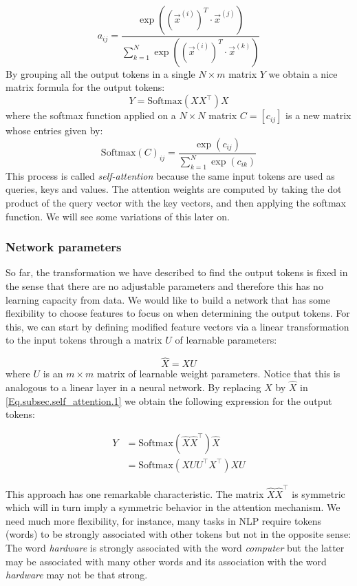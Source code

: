     \[
    a_{ij} = \frac{\exp((\vec{x}^{(i)})^{ T} \cdot \vec{x}^{(j)})}{\sum_{k=1}^N \exp((\vec{x}^{(i)})^{T} \cdot \vec{x}^{(k)})}
    \]
    By grouping all the output tokens in a single $N \times m$ matrix $Y$ we obtain a nice matrix formula for the output tokens: 
    \begin{equation}\label{Eq.subsec.self_attention.1}
        Y = \textrm{Softmax}(X X^\top) X 
    \end{equation}
    where the softmax function applied on a $N\times N$ matrix $C = [c_{ij}]$ is a new matrix whose entries given by:
    \[ \textrm{Softmax}(C)_{ij} = \frac{\exp(c_{ij})}{\sum_{k=1}^N \exp(c_{ik})} \] 
    This process is called \emph{self-attention} because the same input tokens are used as queries, keys and values. The attention weights are computed by taking the dot product of the query vector with the key vectors, and then applying the softmax function. We will see some variations of this later on.
    
    \subsubsection*{Network parameters}
    So far, the transformation we have described to find the output tokens is fixed in the sense that there are no adjustable parameters and therefore this has no learning capacity from data. We would like to build a network that has some flexibility to choose features to focus on when determining the output tokens. For this, we can start by defining modified feature vectors via a linear transformation to the input tokens through a matrix $U$ of learnable parameters:

    \[ \widehat{X} = X U \]
    where $U$ is an $m \times m$ matrix of learnable weight parameters. Notice that this is analogous to a linear layer in a neural network. By replacing $X$ by $\widehat{X}$ in \eqref{Eq.subsec.self_attention.1} we obtain the following expression for the output tokens:

    \begin{align}\label{Eq.subsec.self_attention.2}
        Y &= \textrm{Softmax}(\widehat{X} \widehat{X}^\top) \widehat{X} \nonumber \\
        &= \textrm{Softmax}(X U U^\top X^\top) X U 
    \end{align}

    \begin{remark}
        This approach has one remarkable characteristic. The matrix $\widehat{X}\widehat{X}^\top$ is symmetric which will in turn imply a symmetric behavior in the attention mechanism. We need much more flexibility, for instance, many tasks in NLP require tokens (words) to be strongly associated with other tokens but not in the opposite sense: The word \textit{hardware} is strongly associated with the word \textit{computer} but the latter may be associated with many other words and its association with the word \textit{hardware} may not be that strong. 
    \end{remark}

